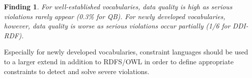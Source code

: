 \documentclass[conference]{IEEEtran}
\newcommand{\ke}[1]{\todo[size=\small, color=red!40]{\textbf{Kai:} #1}}
\newcommand{\bz}[1]{\todo[size=\small, color=blue!40]{\textbf{Ben:} #1}}
\newtheorem{hyp}{Finding}
\begin{document}
\begin{hyp}
For well-established vocabularies, data quality is high as serious violations rarely appear (0.3\% for QB). For newly developed vocabularies, however, data quality is worse as serious violations occur partially (1/6 for DDI-RDF).   
\end{hyp} 

Especially for newly developed vocabularies, constraint languages should be used to a larger extend in addition to RDFS/OWL in order to define appropriate constraints to detect and solve severe violations.

\end{document}
